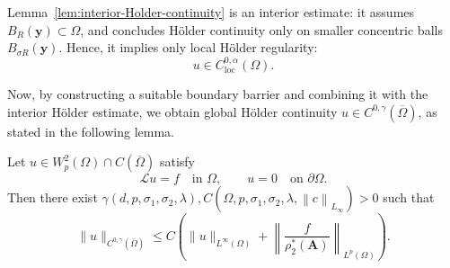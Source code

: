 \documentclass[final,onefignum,onetabnum]{mousaviart}
\begin{document}
	\begin{remark}
		\label{rem:interior-Hölder-continuity}
		Lemma~\ref{lem:interior-Holder-continuity} is an interior estimate: it assumes $B_{R}(\boldsymbol{y}) \subset \Omega$, and concludes Hölder continuity only on smaller concentric balls $B_{\sigma R}(\boldsymbol{y})$. Hence, it implies only local Hölder regularity:
		\begin{equation}
			\label{inc:interior-Hölder-continuity}
			u \in C^{0, \alpha}_{\text{loc}}(\Omega).
		\end{equation}
	\end{remark}
	Now, by constructing a suitable boundary barrier and combining it with the interior Hölder estimate, we obtain global Hölder continuity $u \in C^{0, \gamma}(\overline{\Omega})$, as stated in the following lemma.
	\begin{lemma}
		\label{lemm-Holder-continuity}
		Let $u \in W^2_p(\Omega) \cap C(\overline{\Omega})$ satisfy
		\[
		\mathcal{L} u = f \quad \text{in } \Omega, 
		\qquad 
		u = 0 \quad \text{on } \partial \Omega.
		\]
		Then there exist  $\gamma(d, p, \sigma_1, \sigma_2, \lambda), C(\Omega, p, \sigma_1, \sigma_2, \lambda, \left\| c\right\|_{L_{\infty}} ) > 0$ such that
		\begin{equation}
			\label{ineq:Holder-bound-global}
			\|u\|_{C^{0,\gamma}(\overline{\Omega})}
			\le
			C\left(
			\|u\|_{L^\infty(\Omega)}
			+
			\left\|\frac{f}{\rho_2^{\ast}(\boldsymbol{A})}\right\|_{L^p(\Omega)}
			\right).
		\end{equation}
	\end{lemma}
	
\end{document}
